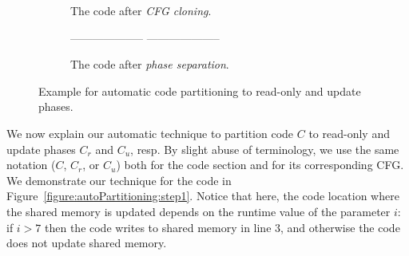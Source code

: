 \begin{figure*}
\begin{center}
\begin{subfigure}[t]{.3\textwidth}
\begin{algorithmic}[0]{}
{            \State\hspace{-3mm}{6':\ return temp}
			\EndFunction
			}
		\end{algorithmic}
		\caption{The code after \emph{CFG cloning}.}
 \label{figure:autoPartitioning:step2}
	\end{subfigure}
	\begin{subfigure}[t]{.35\textwidth}
		\begin{algorithmic}[0]{}
		{\ttfamily
			 \label{codeXXX:aaaaa}
            \Statex -------------------- 
            \State\hspace{-3mm}{1 :\ x.lock()}
            \State\hspace{-3mm}{2 :\ if i>7  then}
            \State{}
            \State\hspace{-3mm}{4 :\ temp = x.f1 + x.f2}
            \State\hspace{-3mm}{5 :\ x.unlock()}
            \State{}
            \Statex -------------------- 
            \State\hspace{-3mm}{1':\ x.lock()}
            \State\hspace{-3mm}{2':\ if x.f1>i  then}
            \State\hspace{-3mm}{3':\ \ \ x.f2 = i}
            \State\hspace{-3mm}{4':\ temp = x.f1 + x.f2}
            \State\hspace{-3mm}{5':\ x.unlock()}
            \State\hspace{-3mm}{6':\ return temp}
			\EndFunction
			}
		\end{algorithmic}
		\caption{The code after \emph{phase separation}.
} \label{figure:autoPartitioning:step3}
	\end{subfigure}

	\end{center}
\vspace{-4mm}
	\caption{Example for automatic code partitioning to read-only and update phases.}
			\label{figure:autoPartitioning}
\end{figure*}

We now explain our automatic technique to partition code $C$ to read-only and update phases $C_r$ and $C_u$, resp.
By slight abuse of terminology, we use the same notation ($C$, $C_r$, or $C_u$) both for the code section and
for its corresponding CFG.
%
We demonstrate our technique for the code in Figure~\ref{figure:autoPartitioning:step1}.
Notice that here, the code location where the shared memory is updated depends on the runtime value of the parameter $i$: if $i>7$ then the code writes to shared memory in line $3$, and otherwise the code does not update shared memory.

